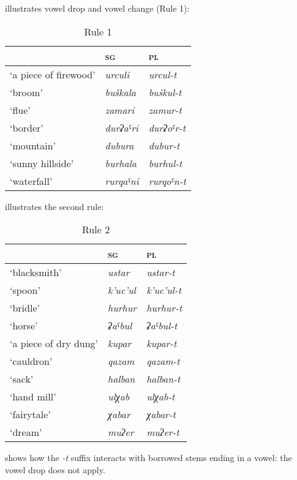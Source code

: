 ﻿\documentclass[output=paper]{langsci/langscibook}
\begin{document}
 illustrates vowel drop and vowel change (Rule 1):

\begin{table}[h]
  \caption{Rule 1}\label{tab:3:2}
\begin{tabular}{@{}lll@{}}
\toprule
& \textsc{sg} & \textsc{pl}\tabularnewline \midrule
`a piece of firewood' & \emph{urculi} & \emph{urcul-t}\tabularnewline
`broom' & \emph{buškala} & \emph{buškul-t}\tabularnewline
`flue' & \emph{zamari} & \emph{zamur-t}\tabularnewline
`border' & \emph{durʡaˤri} & \emph{durʡoˤr-t}\tabularnewline
`mountain' & \emph{dubura} & \emph{dubur-t}\tabularnewline
`sunny hillside' & \emph{burhala} & \emph{burhul-t}\tabularnewline
`waterfall' & \emph{rurqaˤni} & \emph{rurqoˤn-t}\tabularnewline
\bottomrule
\end{tabular}
\end{table}

 illustrates the second rule:

\begin{table}[h]
  \caption{Rule 2}\label{tab:3:3}
  
\begin{tabular}{@{}lll@{}}
\toprule
& \textsc{sg} & \textsc{pl}\tabularnewline \midrule
`blacksmith' & \emph{ustar} & \emph{ustar-t}\tabularnewline
`spoon' & \emph{k'uc'ul} & \emph{k'uc'ul-t}\tabularnewline
`bridle' & \emph{hurhur} & \emph{hurhur-t }\tabularnewline
`horse' & \emph{ʡaˤbul} & \emph{ʡaˤbul-t}\tabularnewline
`a piece of dry dung' & \emph{kupar} & \emph{kupar-t}\tabularnewline
`cauldron' & \emph{qazam} & \emph{qazam-t}\tabularnewline
`sack' & \emph{halban} & \emph{halban-t}\tabularnewline
`hand mill' & \emph{ulχab} & \emph{ulχab-t}\tabularnewline
`fairytale' & \emph{χabar} & \emph{χabar-t}\tabularnewline
`dream' & \emph{muʔer} & \emph{muʔer-t}\tabularnewline
\bottomrule
\end{tabular}
\end{table}


 shows how the \emph{-t} suffix interacts with borrowed stems
ending in a vowel: the vowel drop does not apply.
\end{document}
